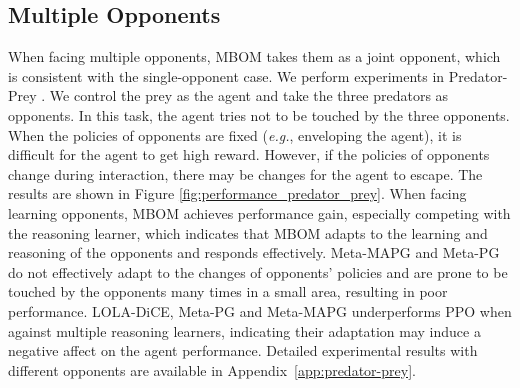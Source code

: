 \documentclass{article}
\begin{document}
\subsection{Multiple Opponents}

When facing multiple opponents, MBOM takes them as a joint opponent, which is consistent with the single-opponent case. We perform experiments in Predator-Prey \citep{lowe2017multi}. We control the prey as the agent and take the three predators as opponents. In this task, the agent tries not to be touched by the three opponents. When the policies of opponents are fixed (\textit{e.g.}, enveloping the agent), it is difficult for the agent to get high reward. However, if the policies of opponents change during interaction, there may be changes for the agent to escape.   
The results are shown in Figure \ref{fig:performance_predator_prey}. When facing learning opponents, MBOM achieves performance gain, especially competing with the reasoning learner, which indicates that MBOM adapts to the learning and reasoning of the opponents and responds effectively. Meta-MAPG and Meta-PG do not effectively adapt to the changes of opponents' policies and are prone to be touched by the opponents many times in a small area, resulting in poor performance. LOLA-DiCE, Meta-PG and Meta-MAPG underperforms PPO when against multiple reasoning learners, indicating their adaptation may induce a negative affect on the agent performance. Detailed experimental results with different opponents are available in Appendix~\ref{app:predator-prey}. 

\end{document}
